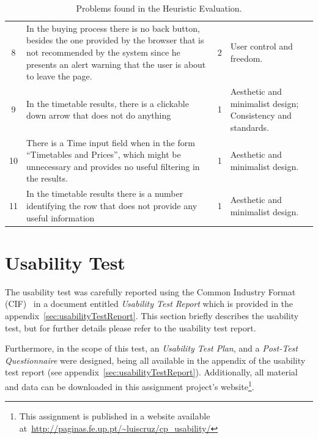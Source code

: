 \documentclass[a4paper]{article}
\begin{document}
\begin{table}[h]
\begin{center}
\begin{tabular}{c | p{8cm} | c | p{4.5cm}}
8 & In the buying process there is no back button, besides the one provided by the browser that is not recommended by the system since he presents an alert warning that the user is about to leave the page. & \cellcolor{orange!20}2 & User control and freedom.\\

9  &  In the timetable results, there is a clickable down arrow that does not do anything  & \cellcolor{yellow!10} 1 &  Aesthetic and minimalist design; Consistency and standards.  \\

	10  &  There is a Time input field when in the form ``Timetables and Prices'', which might be unnecessary and provides no useful filtering in the results.  & \cellcolor{yellow!10} 1 &  Aesthetic and minimalist design.  \\
	
		11 &  In the timetable results there is a number identifying the row that does not provide any useful information & \cellcolor{yellow!10} 1 & Aesthetic and minimalist design.\\
	
\hline
\end{tabular}
\end{center}
\caption{Problems found in the Heuristic Evaluation.}
\label{tab:heuristic_results}
\end{table}


\section{Usability Test}

The usability test was carefully reported using the Common Industry Format (CIF)~\citep{iusr2006cif} in a document entitled \emph{Usability Test Report} which is provided in the appendix~\ref{sec:usabilityTestReport}. This section briefly describes the usability test, but for further details please refer to the usability test report.

Furthermore, in the scope of this test, an \emph{Usability Test Plan}, and a \emph{Post-Test Questionnaire} were designed, being all available in the appendix of the usability test report (see appendix~\ref{sec:usabilityTestReport}). Additionally, all material and data can be downloaded in this assignment project's website\footnote{This assignment is published in a website available at~\url{http://paginas.fe.up.pt/~luiscruz/cp_usability/}}.
\end{document}
